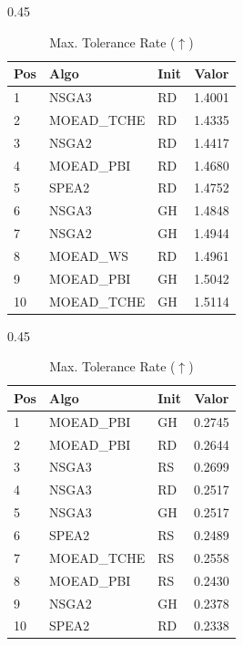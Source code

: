 \documentclass[a4paper,10pt]{article} %
\begin{document}
\begin{table}[H]
    \centering
    \begin{subtable}[t]{0.45\textwidth}
        \centering
        \caption{MinSum ($\downarrow$)}
        \begin{tabular}{lllc}
            \toprule
            Pos & Algo & Init & Valor \\
            \midrule
            1 & NSGA3 & RD & 1.4001 \\
            2 & MOEAD\_TCHE & RD & 1.4335 \\
            3 & NSGA2 & RD & 1.4417 \\
            4 & MOEAD\_PBI & RD & 1.4680 \\
            5 & SPEA2 & RD & 1.4752 \\
            6 & NSGA3 & GH & 1.4848 \\
            7 & NSGA2 & GH & 1.4944 \\
            8 & MOEAD\_WS & RD & 1.4961 \\
            9 & MOEAD\_PBI & GH & 1.5042 \\
            10 & MOEAD\_TCHE & GH & 1.5114 \\
            \bottomrule
        \end{tabular}
    \end{subtable}
    \hfill
    \begin{subtable}[t]{0.45\textwidth}
        \centering
        \caption{Max. Tolerance Rate ($\uparrow$)}
        \begin{tabular}{lllc}
            \toprule
            Pos & Algo & Init & Valor \\
            \midrule
            1 & MOEAD\_PBI & GH & 0.2745 \\
            2 & MOEAD\_PBI & RD & 0.2644 \\
            3 & NSGA3 & RS & 0.2699 \\
            4 & NSGA3 & RD & 0.2517 \\
            5 & NSGA3 & GH & 0.2517 \\
            6 & SPEA2 & RS & 0.2489 \\
            7 & MOEAD\_TCHE & RS & 0.2558 \\
            8 & MOEAD\_PBI & RS & 0.2430 \\
            9 & NSGA2 & GH & 0.2378 \\
            10 & SPEA2 & RD & 0.2338 \\
            \bottomrule
        \end{tabular}
    \end{subtable}
\end{table}
\end{document}

